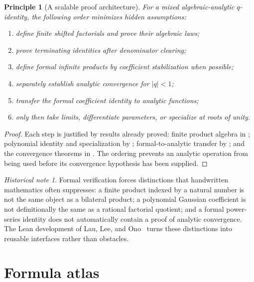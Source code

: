 \documentclass[11pt,oneside,openany]{book}
\newtheorem{principle}[theorem]{Principle}
\theoremstyle{definition}
\theoremstyle{remark}
\newtheorem{historicalnote}[theorem]{Historical note}
\newcommand{\abs}[1]{\lvert #1\rvert}
\begin{document}
\begin{principle}[A scalable proof architecture]\label{prin:proof-architecture}
For a mixed algebraic-analytic $q$-identity, the following order minimizes hidden assumptions:
\begin{enumerate}
\item define finite shifted factorials and prove their algebraic laws;
\item prove terminating identities after denominator clearing;
\item define formal infinite products by coefficient stabilization when possible;
\item separately establish analytic convergence for $\abs q<1$;
\item transfer the formal coefficient identity to analytic functions;
\item only then take limits, differentiate parameters, or specialize at roots of unity.
\end{enumerate}
\end{principle}

\begin{proof}
Each step is justified by results already proved: finite product algebra in ; polynomial identity and specialization by ; formal-to-analytic transfer by ; and the convergence theorems in .  The ordering prevents an analytic operation from being used before its convergence hypothesis has been supplied.
\end{proof}

\begin{historicalnote}
Formal verification forces distinctions that handwritten mathematics often suppresses: a finite product indexed by a natural number is not the same object as a bilateral product; a polynomial Gaussian coefficient is not definitionally the same as a rational factorial quotient; and a formal power-series identity does not automatically contain a proof of analytic convergence.  The Lean development of Lau, Lee, and Ono~\cite{LauLeeOno2026} turns these distinctions into reusable interfaces rather than obstacles.
\end{historicalnote}

\appendix

\chapter{Formula atlas}\label{app:atlas}
\end{document}
